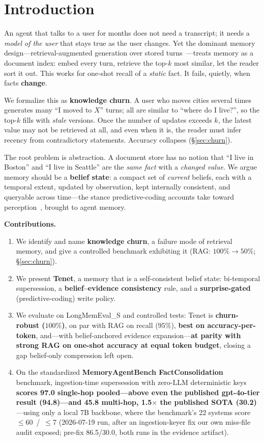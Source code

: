 \documentclass[11pt]{article}
\begin{document}
\section{Introduction}
An agent that talks to a user for months does not need a transcript; it needs a
\emph{model of the user} that stays true as the user changes. Yet the dominant memory
design---retrieval-augmented generation over stored turns~\cite{mem0,longmemeval}---treats
memory as a document index: embed every turn, retrieve the top-$k$ most similar, let the
reader sort it out. This works for one-shot recall of a \emph{static} fact. It fails,
quietly, when facts \textbf{change}.

We formalize this as \textbf{knowledge churn}. A user who moves cities several times
generates many ``I moved to $X$'' turns; all are similar to ``where do I live?'', so the
top-$k$ fills with \emph{stale} versions. Once the number of updates exceeds $k$, the latest
value may not be retrieved at all, and even when it is, the reader must infer recency from
contradictory statements. Accuracy collapses (\S\ref{sec:churn}).

The root problem is abstraction. A document store has no notion that ``I live in Boston''
and ``I live in Seattle'' are the \emph{same fact} with a \emph{changed value}. We argue
memory should be a \textbf{belief state}: a compact set of \emph{current} beliefs, each with
a temporal extent, updated by observation, kept internally consistent, and queryable across
time---the stance predictive-coding accounts take toward
perception~\cite{friston}, brought to agent memory.

\textbf{Contributions.}
\begin{enumerate}\itemsep2pt
\item We identify and name \textbf{knowledge churn}, a failure mode of retrieval memory, and
give a controlled benchmark exhibiting it (RAG: $100\%\!\to\!50\%$; \S\ref{sec:churn}).
\item We present \textbf{Tenet}, a memory that is a self-consistent belief state:
bi-temporal supersession, a \textbf{belief--evidence consistency} rule, and a
\textbf{surprise-gated} (predictive-coding) write policy.
\item We evaluate on LongMemEval\_S and controlled tests: Tenet is \textbf{churn-robust
($100\%$)}, on par with RAG on recall ($95\%$), \textbf{best on accuracy-per-token}, and---with
belief-anchored evidence expansion---\textbf{at parity with strong RAG on one-shot accuracy at
equal token budget}, closing a gap belief-only compression left open.
\item On the standardized \textbf{MemoryAgentBench FactConsolidation} benchmark,
ingestion-time supersession with zero-LLM deterministic keys \textbf{scores 97.0 single-hop
pooled---above even the published gpt-4o-tier result (94.8)---and 45.8 multi-hop, 1.5$\times$
the published SOTA (30.2)}---using only a local 7B backbone, where the benchmark's 22
systems score $\le$60~/~$\le$7 (2026-07-19 run, after an ingestion-keyer fix our own
miss-file audit exposed; pre-fix 86.5/30.0, both runs in the evidence artifact).
\end{enumerate}
\end{document}
